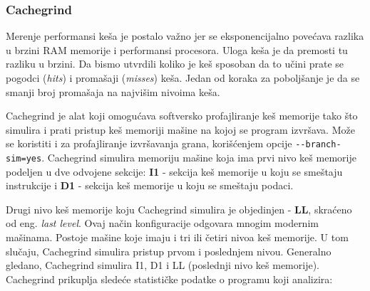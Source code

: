 \subsubsection{Cachegrind}\label{cachegrind}

Merenje performansi keša je postalo važno jer se eksponencijalno povećava razlika u brzini RAM memorije i performansi procesora. Uloga keša je da premosti tu razliku u brzini. Da bismo utvrdili koliko je keš sposoban da to učini prate se pogodci (\emph{hits}) i promašaji (\emph{misses}) keša. Jedan od koraka za poboljšanje je da se smanji broj promašaja na najvišim nivoima keša.

Cachegrind je alat koji omogućava softversko profajliranje keš memorije tako što simulira i prati pristup keš memoriji mašine na kojoj se program izvršava. Može se koristiti i za profajliranje izvršavanja grana, korišćenjem opcije \texttt{-\/-branch-sim=yes}. Cachegrind simulira memoriju mašine koja ima prvi nivo keš memorije podeljen u dve odvojene sekcije: \textbf{I1} - sekcija keš memorije u koju se smeštaju instrukcije i \textbf{D1} - sekcija keš memorije u koju se smeštaju podaci.

Drugi nivo keš memorije koju Cachegrind simulira je objedinjen - \textbf{LL}, skraćeno od eng. \emph{last level}. Ovaj način konfiguracije odgovara mnogim modernim mašinama. Postoje mašine koje imaju i tri ili četiri nivoa keš memorije. U tom slučaju, Cachegrind simulira pristup prvom i poslednjem nivou. Generalno gledano, Cachegrind simulira I1, D1 i LL (poslednji nivo keš memorije). Cachegrind prikuplja sledeće statističke podatke o programu koji analizira:

